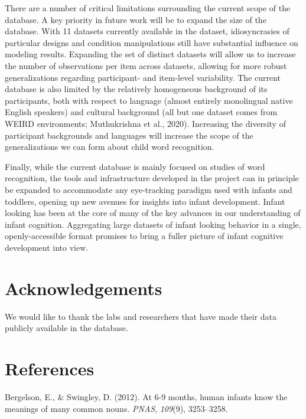 \documentclass[10pt, letterpaper]{article}
\begin{document}
There are a number of critical limitations surrounding the current scope
of the database. A key priority in future work will be to expand the
size of the database. With 11 datasets currently available in the
dataset, idiosyncrasies of particular designs and condition
manipulations still have substantial influence on modeling results.
Expanding the set of distinct datasets will allow us to increase the
number of observations per item across datasets, allowing for more
robust generalizations regarding participant- and item-level
variability. The current database is also limited by the relatively
homogeneous background of its participants, both with respect to
language (almost entirely monolingual native English speakers) and
cultural background (all but one dataset comes from WEIRD environments;
Muthukrishna et al., 2020). Increasing the diversity of participant
backgrounds and languages will increase the scope of the generalizations
we can form about child word recognition.

Finally, while the current database is mainly focused on studies of word
recognition, the tools and infrastructure developed in the project can
in principle be expanded to accommodate any eye-tracking paradigm used
with infants and toddlers, opening up new avenues for insights into
infant development. Infant looking has been at the core of many of the
key advances in our understanding of infant cognition. Aggregating large
datasets of infant looking behavior in a single, openly-accessible
format promises to bring a fuller picture of infant cognitive
development into view.

\hypertarget{acknowledgements}{%
\section{Acknowledgements}\label{acknowledgements}}

We would like to thank the labs and researchers that have made their
data publicly available in the database.

\hypertarget{references}{%
\section{References}\label{references}}

\setlength{\parindent}{-0.1in} 
\setlength{\leftskip}{0.125in}

\noindent

\hypertarget{refs}{}
\leavevmode\hypertarget{ref-Bergelson2012a}{}%
Bergelson, E., \& Swingley, D. (2012). At 6-9 months, human infants know
the meanings of many common nouns. \emph{PNAS}, \emph{109}(9),
3253--3258.
\end{document}
